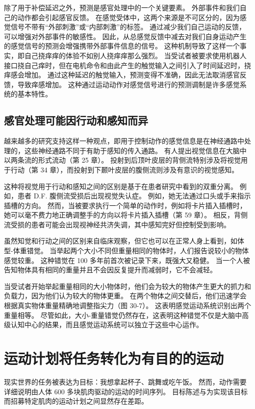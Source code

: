 除了用于补偿延迟之外，预测是感官处理中的一个关键要素。 外部事件和我们自己的动作都会引起感官反馈。 在感觉受体中，这两个来源是不可区分的，因为感觉信号不带有“外部刺激”或“内部刺激”的标签。 通过减少我们自己运动的反馈，可以增强对外部事件的敏感性。 因此，从总感觉反馈中减去对我们自身运动产生的感觉信号的预测会增强携带外部事件信息的信号。 这种机制导致了这样一个事实，即自己挠痒痒的体验不如别人挠痒痒那么强烈。 当受试者被要求使用机器人接口挠自己痒时，但在电机命令和由此产生的触觉输入之间引入了时间延迟时，挠痒感会增加。 通过这种延迟的触觉输入，预测变得不准确，因此无法取消感官反馈，导致痒感增加。 这种通过运动动作对感觉信号进行的预测调制是许多感觉系统的基本特性。

\subsection{感官处理可能因行动和感知而异}

越来越多的研究支持这样一种观点，即用于控制动作的感觉信息是在神经通路中处理的，这些神经通路不同于有助于感知的传入通路。 有人提出视觉信息在大脑中以两条流的形式流动（第 25 章）。 投射到后顶叶皮层的背侧流特别涉及将视觉用于行动（第 34 章），而投射到下颞叶皮层的腹侧流则涉及有意识的视觉感知。

这种将视觉用于行动和感知之间的区别是基于在患者研究中看到的双重分离。 例如，患者 D.F. 腹侧流受损后出现视觉失认症。 例如，她无法通过口头或手来指示插槽的方向。 然而，当被要求执行一个简单的动作时，例如将卡片插入插槽时，她可以毫不费力地正确调整手的方向以将卡片插入插槽（第 59 章）。 相反，背侧流受损的患者可能会出现视神经共济失调，其中感知完好但控制受到影响。

虽然知觉和行动之间的区别来自临床观察，但它也可以在正常人身上看到，如体型-体重错觉。 当举起两个大小不同但重量相同的物体时，人们报告说较小的物体感觉较重。 这种错觉在 100 多年前首次被记录下来，既强大又稳健。 当一个人被告知物体具有相同的重量并且不会因反复提升而减弱时，它不会减轻。

当受试者开始举起重量相同的大小物体时，他们会为较大的物体产生更大的抓力和负载力，因为他们认为较大的物体更重。 在两个物体之间交替后，他们迅速学会根据真实物体重量精确地调整指尖力（图 30-7）。 这表明感觉运动系统识别出两个重量相等。 尽管如此，大小-重量错觉仍然存在，这表明这种错觉不仅是大脑中高级认知中心的结果，而且感觉运动系统可以独立于这些中心运作。

\section{运动计划将任务转化为有目的的运动}
现实世界的任务被表达为目标：我想拿起杯子、跳舞或吃午饭。 然而，动作需要详细说明由人体 600 多块肌肉驱动的运动的时间序列。 目标陈述与为实现该目标而招募特定肌肉的运动计划之间显然存在差距。

